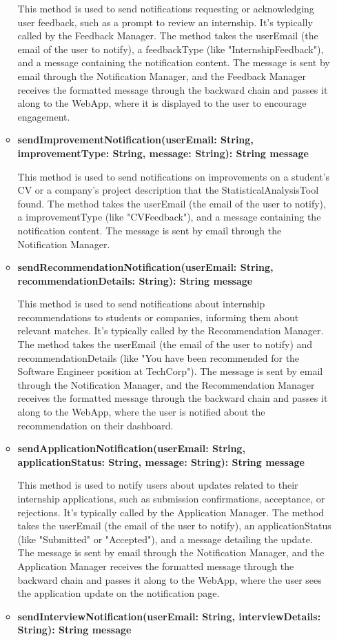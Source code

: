 \begin{itemize}
\begin{itemize}
    This method is used to send notifications requesting or acknowledging user feedback, such as a prompt to review an internship. It’s typically called by the Feedback Manager.
    The method takes the userEmail (the email of the user to notify), a feedbackType (like "InternshipFeedback"), and a message containing the notification content. The message is sent by email through the Notification Manager, and the Feedback Manager receives the formatted message through the backward chain and passes it along to the WebApp, where it is displayed to the user to encourage engagement.

    \item \textbf{sendImprovementNotification(userEmail: String, improvementType: String, message: String): String message
}

    This method is used to send notifications on improvements on a student's CV or a company's project description that the StatisticalAnalysisTool found.
    The method takes the userEmail (the email of the user to notify), a improvementType (like "CVFeedback"), and a message containing the notification content. The message is sent by email through the Notification Manager.
    \item \textbf{sendRecommendationNotification(userEmail: String, recommendationDetails: String): String message
}

    This method is used to send notifications about internship recommendations to students or companies, informing them about relevant matches. It’s typically called by the Recommendation Manager.
    The method takes the userEmail (the email of the user to notify) and recommendationDetails (like "You have been recommended for the Software Engineer position at TechCorp"). The message is sent by email through the Notification Manager, and the Recommendation Manager receives the formatted message through the backward chain and passes it along to the WebApp, where the user is notified about the recommendation on their dashboard.
    \item \textbf{sendApplicationNotification(userEmail: String, applicationStatus: String, message: String): String message}

    This method is used to notify users about updates related to their internship applications, such as submission confirmations, acceptance, or rejections. It’s typically called by the Application Manager.
    The method takes the userEmail (the email of the user to notify), an applicationStatus (like "Submitted" or "Accepted"), and a message detailing the update. The message is sent by email through the Notification Manager, and the Application Manager receives the formatted message through the backward chain and passes it along to the WebApp, where the user sees the application update on the notification page.
    \item \textbf{sendInterviewNotification(userEmail: String, interviewDetails: String): String message}


\end{itemize}
\end{itemize}
